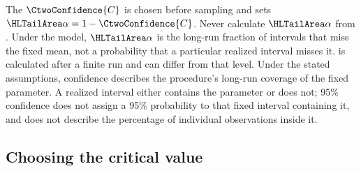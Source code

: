 The  $\CtwoConfidence{C}$ is chosen before sampling and sets $\CtwoSignificance{\alpha}=1-\CtwoConfidence{C}$. Never calculate $\CtwoSignificance{\alpha}$ from . Under the model, $\CtwoSignificance{\alpha}$ is the long-run fraction of intervals that miss the fixed mean, not a probability that a particular realized interval misses it.  is calculated after a finite run and can differ from that level. Under the stated assumptions, confidence describes the procedure's long-run coverage of the fixed parameter. A realized interval either contains the parameter or does not; 95\% confidence does not assign a 95\% probability to that fixed interval containing it, and does not describe the percentage of individual observations inside it.

\clearpage
\subsection{Choosing the critical value}

